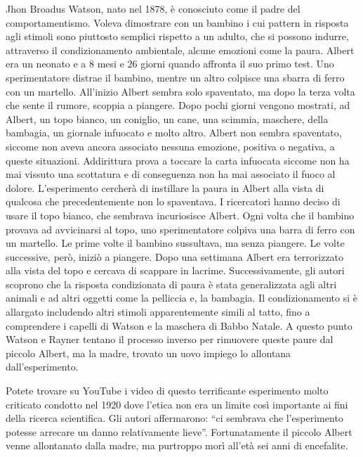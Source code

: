 \documentclass[12pt]{book} %
\begin{document}
\begin{mdframed}[linewidth=1pt]
Jhon Broadus Watson, nato nel 1878, è conosciuto come il padre del comportamentismo. Voleva dimostrare con un bambino i
cui pattern in risposta agli stimoli sono piuttosto semplici rispetto a un adulto, che si possono indurre, attraverso
il condizionamento ambientale, alcune emozioni come la paura. Albert era un neonato e a 8 mesi e 26 giorni quando
affronta il suo primo test. Uno sperimentatore distrae il bambino, mentre un altro colpisce una sbarra di ferro con un
martello. All'inizio Albert sembra solo spaventato, ma dopo la terza volta che sente il rumore,
scoppia a piangere. Dopo pochi giorni vengono mostrati, ad Albert, un topo bianco, un coniglio, un cane, una scimmia,
maschere, della bambagia, un giornale infuocato e molto altro. Albert non sembra spaventato, siccome non aveva ancora
associato nessuna emozione, positiva o negativa, a queste situazioni. Addirittura prova a toccare la carta infuocata
siccome non ha mai vissuto una scottatura e di conseguenza non ha mai associato il fuoco al dolore. L'esperimento
cercherà di instillare la paura in Albert alla vista di qualcosa che precedentemente non lo spaventava. I ricercatori
hanno deciso di usare il topo bianco, che sembrava incuriosisce Albert. Ogni volta che il bambino provava ad
avvicinarsi al topo, uno sperimentatore colpiva una barra di ferro con un martello. Le prime volte il bambino
sussultava, ma senza piangere. Le volte successive, però, iniziò a piangere. Dopo una settimana Albert era terrorizzato
alla vista del topo e cercava di scappare in lacrime. Successivamente, gli autori scoprono che la risposta condizionata
di paura è stata generalizzata agli altri animali e ad altri oggetti come la pelliccia e, la bambagia. Il
condizionamento si è allargato includendo altri stimoli apparentemente simili al tatto, fino a comprendere i capelli di
Watson e la maschera di Babbo Natale. A questo punto Watson e Rayner tentano il processo inverso per rimuovere queste
paure dal piccolo Albert, ma la madre, trovato un uovo impiego lo allontana dall'esperimento. 

Potete trovare su YouTube i video di questo terrificante esperimento molto
criticato condotto nel 1920 dove l'etica
non era un limite così importante ai fini della ricerca scientifica. Gli autori affermarono: “ci sembrava che
l'esperimento potesse arrecare un danno relativamente lieve”. Fortunatamente il piccolo Albert
venne allontanato dalla madre, ma purtroppo morì all'età sei anni di
encefalite.
\end{mdframed}
\end{document}
